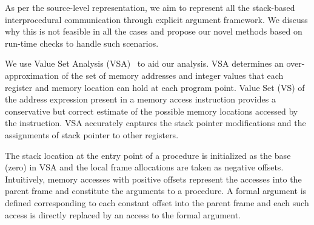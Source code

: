As per the source-level representation, we aim to represent all the stack-based interprocedural communication through explicit argument framework. We discuss why this is not feasible in all the cases and propose our novel methods based on run-time checks to handle such scenarios. 


We use Value Set Analysis (VSA)~\cite{gogul04} to aid our analysis. VSA determines an over-approximation of the set of memory addresses and integer values that each register and memory location can hold at each program point. Value Set (VS) of the address expression present in a memory access instruction provides a conservative but correct estimate of the possible memory locations accessed by the instruction. VSA accurately captures the stack pointer modifications and the assignments of stack pointer to other registers.

The stack location at the entry point of a procedure is initialized as the base (zero) in VSA and the local frame allocations are taken as negative offsets. Intuitively, memory accesses with positive offsets represent the accesses into the parent frame and constitute the arguments to a procedure. A formal argument is defined corresponding to each constant offset into the parent frame and each such access is directly replaced by an access to the formal argument. 

